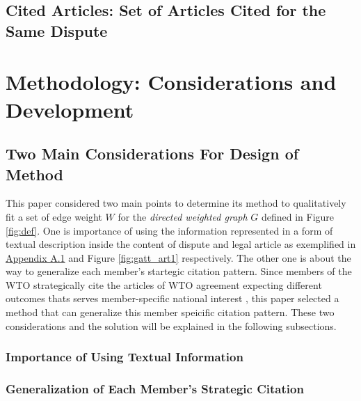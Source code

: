 \documentclass[12pt,letterpaper]{article}
\begin{document}
\subsection{Cited Articles: Set of Articles Cited for the Same Dispute}


\section{Methodology: Considerations and Development}


\subsection{Two Main Considerations For Design of Method} \label{justification-nn}
This paper considered two main points to
determine its method to qualitatively fit a set of edge weight $W$ for the \textit{directed weighted graph} $G$ defined in Figure \ref{fig:def}. One is importance of using the information represented in a form of textual description inside the content of dispute and legal article as exemplified in \hyperref[sub:factual-aspect-example]{Appendix A.1} and Figure {\ref{fig:gatt_art1}} respectively. The other one is about the way to generalize each member's startegic citation pattern. Since members of the WTO strategically cite
the articles of WTO agreement expecting different outcomes thats serves member-specific national interest \citep{who_gets, pelc, latent}, this paper
selected a method that can generalize this member speicific citation pattern. These two considerations and the solution will be explained in the following subsections.


\subsubsection{Importance of Using Textual Information}


\subsubsection{Generalization of Each Member's Strategic Citation}
\end{document}
